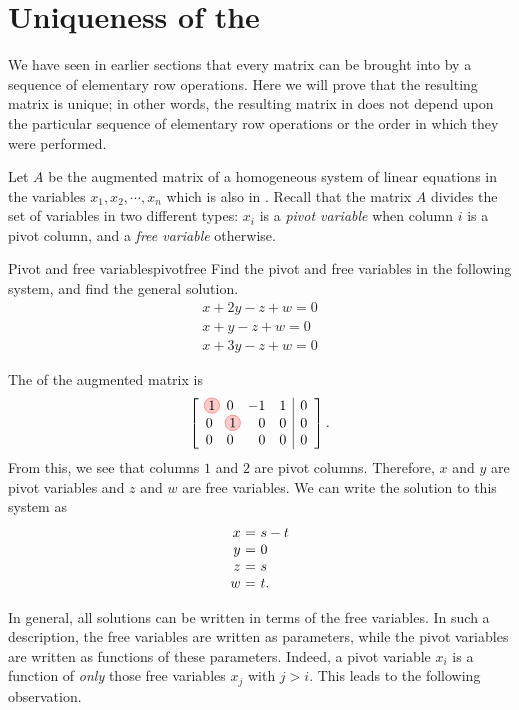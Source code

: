 \section{Uniqueness of the {\rref}}

We have seen in earlier sections that every matrix can be brought into
{\rref} by a sequence of elementary row operations. Here we will prove
that the resulting matrix is unique; in other words, the resulting
matrix in {\rref} does not depend upon the particular sequence of
elementary row operations or the order in which they were performed.

Let $A$ be the augmented matrix of a homogeneous system of linear
equations in the variables $x_1, x_2, \cdots, x_n$ which is also in
{\rref}. Recall that the matrix $A$ divides the set of variables in
two different types: $x_i$ is a
{\em pivot variable} when column $i$ is a pivot
column, and a {\em free variable} otherwise.

\begin{example}{Pivot and free variables}{pivotfree}
Find the pivot and free variables in the following system, and find
the general solution.
\[
\begin{array}{c}
x+2y-z+w=0 \\
x+y-z+w=0 \\
x+3y-z+w=0
\end{array}
\]
\end{example}

\begin{solution}
The {\rref} of the augmented matrix is
\[
\leftB
\begin{array}{rrrr|r}
\circled{1} & 0 & -1 & 1 & 0 \\
0 & \circled{1} & 0 & 0 & 0 \\
0 & 0 & 0 & 0 & 0
\end{array}
\rightB.
\]
From this, we see that columns $1$ and $2$ are pivot
columns. Therefore, $x$ and $y$ are pivot variables and $z$ and $w$
are free variables. We can write the solution to this system as
\[
\begin{array}{r@{~}c@{~}l}
x &=& s-t \\
y &=& 0 \\
z &=& s \\
w &=& t.
\end{array}
\]
\end{solution}

In general, all solutions can be written in terms of the free
variables. In such a description, the free variables are written as
parameters, while the pivot variables are written as functions of
these parameters. Indeed, a pivot variable $x_i$ is a function of {\em
  only} those free variables $x_j$ with $j>i$. This leads to the
following observation.

